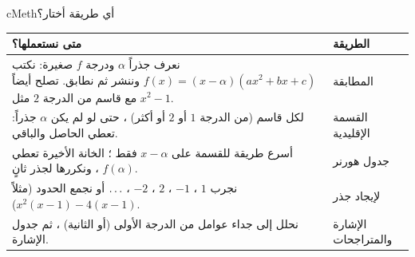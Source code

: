 \documentclass[12pt,a4paper]{article}
\newenvironment{BOX}[2]{\begin{otherlanguage}{english}\begin{arbox}{#1}{#2}}{\end{arbox}\end{otherlanguage}}
\newenvironment{tariqa}[1][طريقة]{\begin{BOX}{cMeth}{#1}}{\end{BOX}}
\renewcommand{\ldots}{\mathinner{\ldotp\ldotp\ldotp}}
\begin{document}
\begin{tariqa}[أي طريقة أختار؟]
\begin{center}
\renewcommand{\arraystretch}{1.45}
\begin{tabular}{|p{}|p{}|}\hline
\rowcolor{cMeth!15}\textbf{متى نستعملها؟} & \textbf{الطريقة}\\\hline
نعرف جذراً $\alpha$ ودرجة $f$ صغيرة: نكتب $f(x)=(x-\alpha)(ax^2+bx+c)$ وننشر ثم نطابق. تصلح أيضاً مع قاسم من الدرجة $2$ مثل $x^2-1$. & المطابقة\\\hline
لكل قاسم (من الدرجة $1$ أو $2$ أو أكثر) ، حتى لو لم يكن $\alpha$ جذراً: تعطي الحاصل والباقي. & القسمة الإقليدية\\\hline
أسرع طريقة للقسمة على $x-\alpha$ فقط ؛ الخانة الأخيرة تعطي $f(\alpha)$ ، ونكررها لجذر ثانٍ. & جدول هورنر\\\hline
نجرب $1$ ، $-1$ ، $2$ ، $-2$ ، $\ldots$ أو نجمع الحدود (مثلاً $x^2(x-1)-4(x-1)$). & لإيجاد جذر\\\hline
نحلل إلى جداء عوامل من الدرجة الأولى (أو الثانية) ، ثم جدول الإشارة. & الإشارة والمتراجحات\\\hline
\end{tabular}
\end{center}
\end{tariqa}

\end{document}
